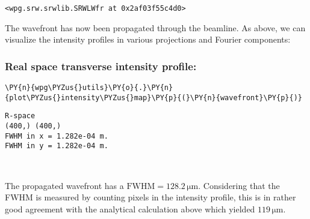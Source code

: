            \begin{tcolorbox}[breakable, size=fbox, boxrule=.5pt, pad at break*=1mm, opacityfill=0]
\begin{Verbatim}[commandchars=\\\{\}]
<wpg.srw.srwlib.SRWLWfr at 0x2af03f55c4d0>
\end{Verbatim}
\end{tcolorbox}
        
    The wavefront has now been propagated through the beamline. As above, we
can visualize the intensity profiles in various projections and Fourier
components:

    \hypertarget{real-space-transverse-intensity-profile}{%
\subsubsection{Real space transverse intensity
profile:}\label{real-space-transverse-intensity-profile}}

    \begin{tcolorbox}[breakable, size=fbox, boxrule=1pt, pad at break*=1mm,colback=cellbackground, colframe=cellborder]
\begin{Verbatim}[commandchars=\\\{\}]
\PY{n}{wpg\PYZus{}utils}\PY{o}{.}\PY{n}{plot\PYZus{}intensity\PYZus{}map}\PY{p}{(}\PY{n}{wavefront}\PY{p}{)}
\end{Verbatim}
\end{tcolorbox}

    \begin{Verbatim}[commandchars=\\\{\}]
R-space
(400,) (400,)
FWHM in x = 1.282e-04 m.
FWHM in y = 1.282e-04 m.
    \end{Verbatim}

    \begin{center}
    \end{center}
    { \hspace*{\fill} \\}
    
    The propagated wavefront has a
\(\mathrm{FWHM} = 128.2\,\mathrm{\mu m}\). Considering that the FWHM is
measured by counting pixels in the intensity profile, this is in rather
good agreement with the analytical calculation above which yielded
\(119\,\mathrm{\mu m}\).

